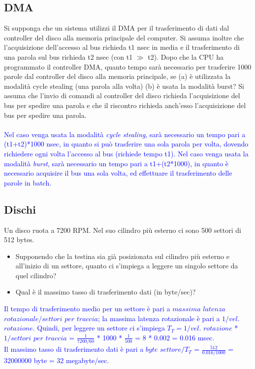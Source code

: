 \documentclass[12pt]{article}
\begin{document}
\subsection{DMA}
Si supponga che un sistema utilizzi il DMA per il trasferimento di dati dal controller del disco alla memoria principale del computer. Si assuma inoltre che l'acquisizione dell'accesso al bus richieda
t1 nsec in media e il trasferimento di una parola sul bus richieda t2 nsec (con t1 $\gg$ t2). Dopo che la CPU ha programmato il controller DMA, quanto tempo sarà necessario per trasferire 1000 parole
dal controller del disco alla memoria principale, se (a) è utilizzata la modalità cycle stealing (una parola alla volta) (b) è usata la modalità burst? Si assuma che l'invio di comandi al controller del
disco richieda l'acquisizione del bus per spedire una parola e che il riscontro richieda anch'esso l'acquisizione del bus per spedire una parola.\\\\
\textcolor{blue}{Nel caso venga usata la modalità \textit{cycle stealing}, sarà necessario un tempo pari a (t1+t2)*1000 nsec, in quanto si può trasferire una sola parola per volta, dovendo richiedere ogni volta l'accesso
al bus (richiede tempo t1). Nel caso venga usata la modalità \textit{burst}, sarà necessario un tempo pari a t1+(t2*1000), in quanto è necessario acquisire il bus una sola volta, ed effettuare il 
trasferimento delle parole in batch.}
\subsection{Dischi}
Un disco ruota a 7200 RPM. Nel suo cilindro più esterno ci sono 500 settori di 512 bytes.
\begin{itemize}
    \item Supponendo che la testina sia già posizionata sul cilindro più esterno e all'inizio di un settore, quanto ci s'impiega a leggere un singolo settore da quel cilindro?
    \item Qual è il massimo tasso di trasferimento dati (in byte/sec)?\\
\end{itemize}
\textcolor{blue}{Il tempo di trasferimento medio per un settore è pari a $massima$ $latenza$ $rotazionale / settori$ $per$ $traccia$; la massima latenza rotazionale è pari a $1/vel.$ $rotazione$. Quindi, per leggere
un settore ci s'impiega $T_T = 1/vel.$ $rotazione$ * $1/settori$ $per$ $traccia$ = $\frac{1}{7200/60}$ * 1000 * $\frac{1}{500}$ = 8 * 0.002 = 0.016 msec.\\
Il massimo tasso di trasferimento dati è pari a $byte$ $settore/T_T$ = $\frac{512}{0.016/1000}$ = 32000000 byte = 32 megabyte/sec.}
\end{document}
